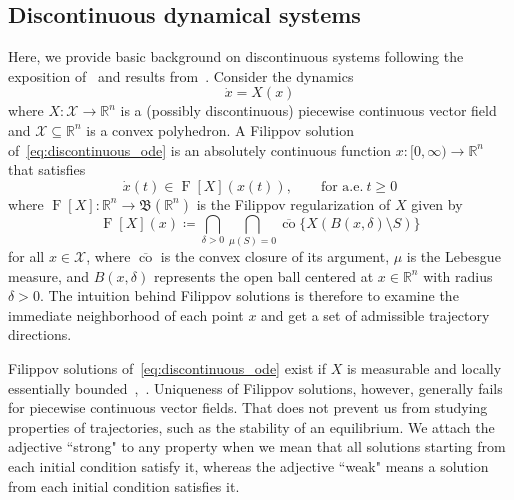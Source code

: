 \documentclass[letterpaper, conference]{ieeeconf}
\newcommand{\R}{\mathbb R}
\newcommand{\X}{\mathcal X}
\newcommand{\1}{\mathbf{1}}
\begin{document}
\subsection{Discontinuous dynamical systems}
Here, we provide basic background on  discontinuous systems following the exposition of~\cite{JC:08} and results from~\cite{AFF:88}.
Consider the dynamics
\begin{equation}\label{eq:discontinuous_ode}
    \dot x = X(x)
\end{equation}
where \(X:\X \rightarrow \R^n\) is a (possibly discontinuous) piecewise continuous vector field and \(\X\subseteq \mathbb R^n\) is a convex polyhedron.
A Filippov solution of~\eqref{eq:discontinuous_ode} is an absolutely continuous function \(x:[0, \infty)\rightarrow \R^n\) that satisfies
\begin{equation}\label{eq:F[discontinuous_ode]}
    \dot x(t) \in \operatorname{F}[X] (x(t)), \qquad\text{for a.e.}\ t \geq 0
\end{equation}
where \(\operatorname{F}[X]:\R^n \rightarrow \mathfrak{B}(\R^n)\) is the Filippov regularization of \(X\) given by
\begin{equation}\label{eq:filippov_reg}
    \operatorname{F}[X](x) \coloneqq \bigcap_{\delta>0}\bigcap_{\mu(S)=0} \overline{\operatorname{co}}\{X(B(x, \delta)\setminus S)\}
\end{equation}
for all \(x \in \X\), where \(\overline{\operatorname{co}}\) is the convex closure of its argument, \(\mu\) is the Lebesgue measure, and \(B(x, \delta)\) represents the open ball centered at \(x\in \R^n\) with radius \(\delta>0\).
The intuition behind Filippov solutions is therefore to examine the immediate neighborhood of each point \(x\) and get a set of admissible trajectory directions.

Filippov solutions of~\eqref{eq:discontinuous_ode} exist if \(X\) is measurable and locally essentially bounded~\cite{AFF:88},~\cite[Proposition 3]{JC:08}.
Uniqueness of Filippov solutions,
however, generally fails for piecewise continuous vector fields.
That does not prevent us from studying properties of trajectories, such as the stability of an equilibrium.
We attach the adjective ``strong" to any property when we mean that all solutions starting from each initial condition satisfy it, whereas the adjective ``weak" means a solution from each initial condition satisfies it.
\end{document}

